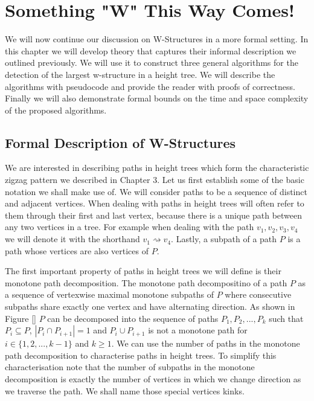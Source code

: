 \chapter{Something "W" This Way Comes!}
\label{chapter4}

We will now continue our discussion on W-Structures in a more formal setting. In this chapter we will develop theory that captures their informal description we outlined previously. We will use it to construct three general algorithms for the detection of the largest w-structure in a height tree. We will describe the algorithms with pseudocode and provide the reader with proofs of correctness. Finally we will also demonstrate formal bounds on the time and space complexity of the proposed algorithms.

\section{Formal Description of W-Structures}


We are interested in describing paths in height trees which form the characteristic zigzag pattern we described in Chapter 3. Let us first establish some of the basic notation we shall make use of. We will consider paths to be a sequence of distinct and adjacent vertices. When dealing with paths in height trees will often refer to them through their first and last vertex, because there is a unique path between any two vertices in a tree. For example when dealing with the path $v_1, v_2, v_3, v_4$ we will denote it with the shorthand $v_1 \rightsquigarrow v_4$. Lastly, a subpath of a path $P$ is a path whose vertices are also vertices of $P$.

The first important property of paths in height trees we will define is their monotone path decomposition. The monotone path decompositino of a path $P$ as a sequence of vertexwise maximal monotone subpaths of $P$ where consecutive subpaths share exactly one vertex and have alternating direction.  As shown in Figure [] $P$ can be decomposed into the sequence of paths $P_1, P_2, ..., P_k$ such that $P_i \subseteq P$, $|P_i \cap P_{i+1}| = 1$ and $P_i \cup P_{i+1}$ is not a monotone path for $i \in \{1, 2, ..., k-1\}$ and $k \ge 1$. We can use the number of paths in the monotone path decomposition to characterise paths in height trees. To simplify this characterisation note that the number of subpaths in the monotone decomposition is exactly the number of vertices in which we change direction as we traverse the path. We shall name those special vertices kinks.

